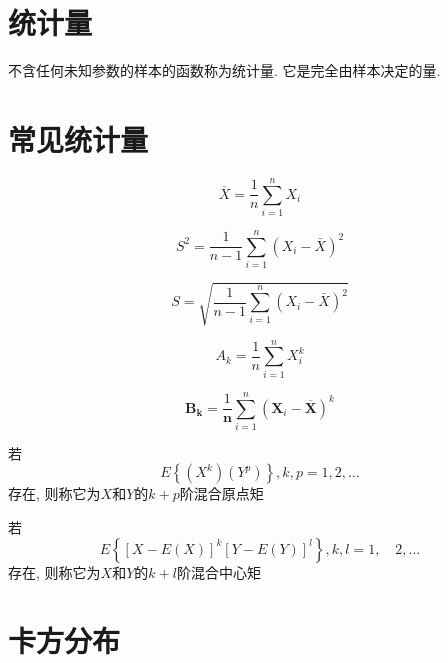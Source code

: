 \section{统计量}

不含任何未知参数的样本的函数称为统计量.
它是完全由样本决定的量.

\section{常见统计量}

\begin{definition}[样本平均值]
    $$\overline{X}=\frac{1}{n} \sum_{i=1}^{n} X_{i}$$
\end{definition}

\begin{definition}[样本方差]
    $$S^{2}=\frac{1}{ n-1} \sum_{i=1}^{n}\left(X_{i}-\bar{X}\right)^{2}$$
\end{definition}

\begin{definition}[样本标准差]
    $$S=\sqrt{\frac{1}{ { n-1} } \sum_{i=1}^{n}\left(X_{i}-\bar{X}\right)^{2}}$$
\end{definition}

\begin{definition}[样本 $k$ 阶原点矩]
    $$A_{k}=\frac{1}{n} \sum_{i=1}^{n} X_{i}^{k}$$
\end{definition}

\begin{definition}[样本 $k$ 阶中心矩]
    $$\boldsymbol{B}_{\boldsymbol{k}}=\frac{1}{\boldsymbol{n}} \sum_{i=1}^{n}\left(\boldsymbol{X}_{i}-\overline{\boldsymbol{X}}\right)^{k}$$
\end{definition}

\begin{definition}[$X$和$Y$的$k+p$阶混合原点矩]
    若
    $$E \left\{\left(X^ k\right)\left(Y^ p\right)\right\}, k, p=1,2, \ldots $$
    存在, 则称它为$X$和$Y$的$k+p$阶混合原点矩
\end{definition}

\begin{definition}[$X$和$Y$的$k+l$阶混合中心矩]
    若
    $$ E\left\{[X-E(X)]^ k[Y-E(Y)]^l \right\},  k,l=1, \quad 2, \ldots $$
    存在, 则称它为$X$和$Y$的$k+l$阶混合中心矩
\end{definition}



\section{卡方分布}


